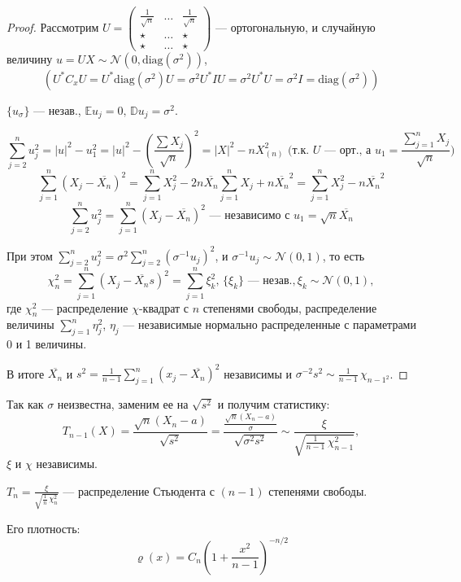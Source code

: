 \begin{enumerate}
\begin{proof}
		Рассмотрим $U = \left(\begin{matrix} \frac1{\sqrt{n}} & \dots & \frac1{\sqrt{n}} \\[-0 pt] \star & \dots & \star \\[-0 pt] \star & \dots & \star \end{matrix}\right)$ --- ортогональную, и случайную величину $u = UX \sim \mathcal{N}(0, \text{diag}(\sigma^2))$, 
		\[ \left( U^{*} C_x U = U^{*}\text{diag}(\sigma^2)U = \sigma^2 U^{*} I U = \sigma^2 U^{*} U = \sigma^2 I = \text{diag}(\sigma^2) \right) \]
		
		$\{ u_{\sigma} \}$ --- незав., $\mathbb{E} u_j = 0, \, \mathbb{D} u_j = \sigma^2$.
		
		\[ \sum_{j=2}^n u_j^2 = |u|^2 - u_1^2 = |u|^2 - \left( \frac{\sum X_j}{\sqrt{n}} \right)^2 = |X|^2 - nX^2_{(n)} \text{ (т.к. $U$ --- орт., а $u_1 = \frac{\sum_{j=1}^n X_j}{\sqrt{n}}$)} \]
		\[ \sum_{j=1}^n (X_j - \overline{X_n})^2 = \sum_{j=1}^n X_j^2 - 2n \overline{X_n} \sum_{j=1}^n X_j + n\overline{X_n}^2 = \sum_{j=1}^n X_j^2 - n\overline{X_n}^2 \]
		\[ \sum_{j=2}^n u_j^2 = \sum_{j=1}^n (X_j - \overline{X_n})^2 \text{ --- независимо с } u_1 = \sqrt{n} \overline{X_n} \]
		
		При этом $\sum_{j=2}^n u_j^2 = \sigma^2 \sum_{j=2}^n (\sigma^{-1} u_j)^2$, и $\sigma^{-1} u_j \sim \mathcal{N}(0, 1)$, то есть
		\[ \chi_n^2 = \sum_{j=1}^n (X_j - \overline{X_n}s)^2 = \sum_{j=1}^n \xi_k^2, \, \{ \xi_k \} \text{ --- незав.}, \xi_k \sim \mathcal{N}(0, 1), \]
		где $\chi_n^2$ --- распределение $\chi$-квадрат с $n$ степенями свободы, распределение величины $\sum_{j=1}^n \eta_j^2$, $\eta_j$ --- независимые нормально распределенные с параметрами 0 и 1 величины.
		
		В итоге $\overline{X_n}$ и $s^2 = \frac1{n-1} \sum_{j=1}^n (x_j - \overline{X_n})^2$ независимы и $\sigma^{-2}s^2 \sim \frac1{n-1}\,\chi_{n-1^2}$.
	\end{proof}
	
	Так как $\sigma$ неизвестна, заменим ее на $\sqrt{s^2}$ и получим статистику:
	\[ T_{n-1}(X) = \frac{\sqrt{n}(X_n - a)}{\sqrt{s^2}} = \frac{\frac{\sqrt{n}(X_n - a)}{\sigma}}{\sqrt{\sigma^2 s^2}} \sim \frac{\xi}{\sqrt{\frac1{n-1}\,\chi^2_{n-1}}}, \]
	$\xi$ и $\chi$ независимы.
	
	$T_{n} = \frac{\xi}{\sqrt{\frac1n\,\chi_n^2}}$ --- распределение Стьюдента с $(n-1)$ степенями свободы.
	
	Его плотность:
	\[ \varrho(x) = C_n \left( 1 + \frac{x^2}{n-1} \right)^{-n/2} \]
 	

\end{enumerate}
